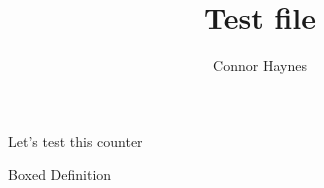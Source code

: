\documentclass[10pt]{article}
\title{Test file}
\author{Connor Haynes}
\date{}
\begin{document}
\maketitle
\begin{boxProb}{}
  Let's test this counter
\end{boxProb}
\begin{boxDef}{}
  Boxed Definition
\end{boxDef}
\end{document}
